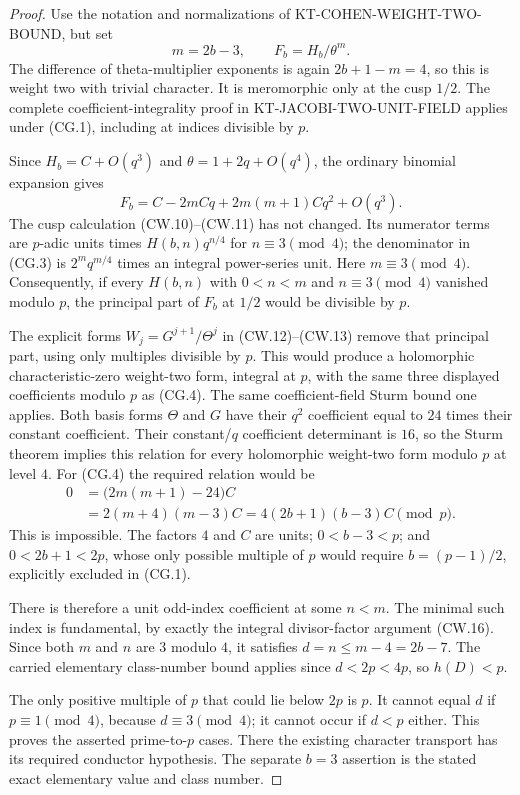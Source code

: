 \begin{proof}
Use the notation and normalizations of
KT-COHEN-WEIGHT-TWO-BOUND, but set
\[
                  m=2b-3,\qquad F_b=H_b/\theta^m.
 \tag{CG.3}
\]
The difference of theta-multiplier exponents is again
$2b+1-m=4$, so this is weight two with trivial character.
It is meromorphic only at the cusp $1/2$.
The complete coefficient-integrality proof in
KT-JACOBI-TWO-UNIT-FIELD applies under (CG.1), including
at indices divisible by $p$.

Since $H_b=C+O(q^3)$ and $\theta=1+2q+O(q^4)$,
the ordinary binomial expansion gives
\[
 F_b=C-2mCq+2m(m+1)Cq^2+O(q^3).
 \tag{CG.4}
\]
The cusp calculation (CW.10)--(CW.11) has not changed.
Its numerator terms are $p$-adic units times
$H(b,n)q^{n/4}$ for $n\equiv3\pmod4$;
the denominator in (CG.3) is $2^m q^{m/4}$ times
an integral power-series unit.  Here $m\equiv3\pmod4$.
Consequently, if every $H(b,n)$ with $0<n<m$ and
$n\equiv3\pmod4$ vanished modulo $p$, the principal
part of $F_b$ at $1/2$ would be divisible by $p$.

The explicit forms $W_j=G^{j+1}/\Theta^j$ in
(CW.12)--(CW.13) remove that principal part, using only
multiples divisible by $p$.  This would produce a
holomorphic characteristic-zero weight-two form, integral
at $p$, with the same three displayed coefficients modulo
$p$ as (CG.4).  The same coefficient-field Sturm bound
one applies.
Both basis forms $\Theta$ and $G$ have their $q^2$
coefficient equal to $24$ times their constant coefficient.
Their constant/$q$ coefficient determinant is $16$, so
the Sturm theorem implies this relation for every
holomorphic weight-two form modulo $p$ at level $4$.
For (CG.4) the required relation would be
\[
 \begin{aligned}
 0&=\bigl(2m(m+1)-24\bigr)C\\
  &=2(m+4)(m-3)C
    =4(2b+1)(b-3)C\pmod p.
 \end{aligned}
 \tag{CG.5}
\]
This is impossible.  The factors $4$ and $C$ are units;
$0<b-3<p$; and $0<2b+1<2p$, whose only possible
multiple of $p$ would require $b=(p-1)/2$, explicitly
excluded in (CG.1).

There is therefore a unit odd-index coefficient at some
$n<m$.  The minimal such index is fundamental, by exactly
the integral divisor-factor argument (CW.16).
Since both $m$ and $n$ are $3$ modulo $4$, it satisfies
$d=n\leq m-4=2b-7$.
The carried elementary class-number bound applies since
$d<2p<4p$, so $h(D)<p$.

The only positive multiple of $p$ that could lie below
$2p$ is $p$.  It cannot equal $d$ if $p\equiv1\pmod4$,
because $d\equiv3\pmod4$; it cannot occur if $d<p$
either.  This proves the asserted prime-to-$p$ cases.
There the existing character transport has its required
conductor hypothesis.  The separate $b=3$ assertion is
the stated exact elementary value and class number.
\end{proof}


